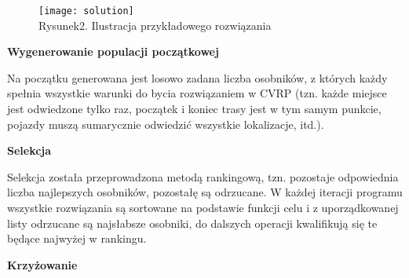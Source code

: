 \documentclass[a4paper, twoside, 12pt, justified]{article}
\begin{document}
	\begin{figure}[h]
		\texttt{[image: solution]}
		\centering
		\\
		{Rysunek2. Ilustracja przykładowego rozwiązania}
	\end{figure}
	
	\newpage
	\begin{center}
		\textbf{Wygenerowanie populacji początkowej}
	\end{center}
	
	Na początku generowana jest losowo zadana liczba osobników, z których każdy spełnia wszystkie warunki do bycia rozwiązaniem w CVRP (tzn. każde miejsce jest odwiedzone tylko raz, początek i koniec trasy jest w tym samym punkcie, pojazdy muszą sumarycznie odwiedzić wszystkie lokalizacje, itd.). 
	
	\begin{center}
		\textbf{Selekcja}
	\end{center}

	Selekcja została przeprowadzona metodą rankingową, tzn. pozostaje odpowiednia liczba najlepszych osobników, pozostałę są odrzucane. W każdej iteracji programu wszystkie rozwiązania są sortowane na podstawie funkcji celu i z uporządkowanej listy odrzucane są najsłabsze osobniki, do dalszych operacji kwalifikują się te będące najwyżej w rankingu.
	
	\begin{center}
		\textbf{Krzyżowanie}
	\end{center}
	
\end{document}
